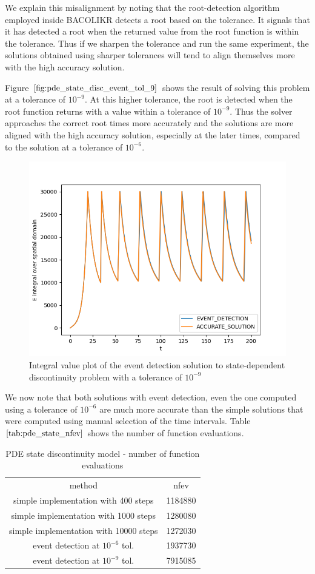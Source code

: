 \documentclass{article}
\begin{document}
We explain this misalignment by noting that the root-detection algorithm employed inside BACOLIKR detects a root based on the tolerance. It signals that it has detected a root when the returned value from the root function is within the tolerance. Thus if we sharpen the tolerance and run the same experiment, the solutions obtained using sharper tolerances will tend to align themselves more with the high accuracy solution.

Figure $\ref{fig:pde_state_disc_event_tol_9}$ shows the result of solving this problem at a tolerance of $10^{-9}$. At this higher tolerance, the root is detected when the root function returns with a value within a tolerance of $10^{-9}$. Thus the solver approaches the correct root times more accurately and the solutions are more aligned with the high accuracy solution, especially at the later times, compared to the solution at a tolerance of $10^{-6}$.


\begin{figure}[H]
\centering
\includegraphics[width=0.7\linewidth]{./figures/pde_state_disc_event_tol_9}
\caption{Integral value plot of the event detection solution to state-dependent discontinuity problem with a tolerance of $10^{-9}$}
\label{fig:pde_state_disc_event_tol_9}
\end{figure}

We now note that both solutions with event detection, even the one computed using a tolerance of $10^{-6}$ are much more accurate than the simple solutions that were computed using manual selection of the time intervals. Table $\ref{tab:pde_state_nfev}$ shows the number of function evaluations. 

\begin{table}[h]
\caption {PDE state discontinuity model - number of function evaluations} 
\label{tab:pde_state_nfev}
\begin{center}
\begin{tabular}{ c c } 
method & nfev \\ 
simple implementation with 400 steps   & 1184880 \\
simple implementation with 1000 steps  & 1280080 \\
simple implementation with 10000 steps & 1272030 \\
event detection at $10^{-6}$ tol.     & 1937730 \\
event detection at $10^{-9}$ tol.     & 7915085 \\
\end{tabular}
\end{center}
\end{table}
\end{document}
